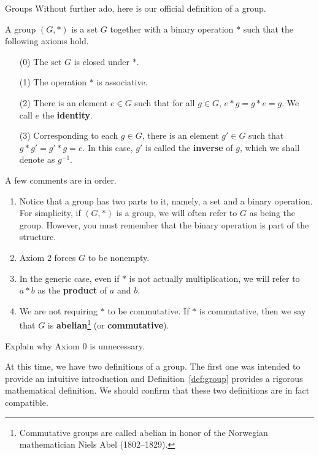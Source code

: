 \begin{section}{Groups}
Without further ado, here is our official definition of a group.

\begin{definition}\label{def:group}
A group $(G,*)$ is a set $G$ together with a binary operation $*$ such that the following axioms hold.
\begin{enumerate}
\item[(0)] The set $G$ is closed under $*$.
\item[(1)] The operation $*$ is associative.
\item[(2)] There is an element $e\in G$ such that for all $g\in G$, $e*g=g*e=g$.  We call $e$ the \textbf{identity}.
\item[(3)] Corresponding to each $g\in G$, there is an element $g'\in G$ such that $g*g'=g'*g=e$.  In this case, $g'$ is called the \textbf{inverse} of $g$, which we shall denote as $g^{-1}$.
\end{enumerate}
\end{definition}

\begin{remark}
A few comments are in order.
\begin{enumerate}[label=\rm{(\alph*)}]
\item Notice that a group has two parts to it, namely, a set and a binary operation.  For simplicity, if $(G,*)$ is a group, we will often refer to $G$ as being the group.  However, you must remember that the binary operation is part of the structure.
\item Axiom 2 forces $G$ to be nonempty.
\item In the generic case, even if $*$ is not actually multiplication, we will refer to $a*b$ as the \textbf{product} of $a$ and $b$.
\item We are not requiring $*$ to be commutative.  If $*$ is commutative, then we say that $G$ is \textbf{abelian}\footnote{Commutative groups are called abelian in honor of the Norwegian mathematician Niels Abel (1802--1829).} (or \textbf{commutative}).
\end{enumerate}
\end{remark}

\begin{exercise}
Explain why Axiom 0 is unnecessary.
\end{exercise}

At this time, we have two definitions of a group.  The first one was intended to provide an intuitive introduction and Definition~\ref{def:group} provides a rigorous mathematical definition.  We should confirm that these two definitions are in fact compatible.


\end{section}
